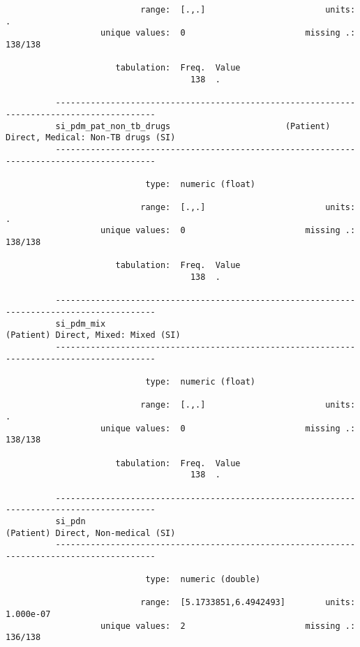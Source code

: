 \documentclass{article}
\begin{document}
\begin{verbatim}
                           range:  [.,.]                        units:  .
                   unique values:  0                        missing .:  138/138
          
                      tabulation:  Freq.  Value
                                     138  .
          
          ------------------------------------------------------------------------------------------
          si_pdm_pat_non_tb_drugs                       (Patient) Direct, Medical: Non-TB drugs (SI)
          ------------------------------------------------------------------------------------------
          
                            type:  numeric (float)
          
                           range:  [.,.]                        units:  .
                   unique values:  0                        missing .:  138/138
          
                      tabulation:  Freq.  Value
                                     138  .
          
          ------------------------------------------------------------------------------------------
          si_pdm_mix                                             (Patient) Direct, Mixed: Mixed (SI)
          ------------------------------------------------------------------------------------------
          
                            type:  numeric (float)
          
                           range:  [.,.]                        units:  .
                   unique values:  0                        missing .:  138/138
          
                      tabulation:  Freq.  Value
                                     138  .
          
          ------------------------------------------------------------------------------------------
          si_pdn                                                  (Patient) Direct, Non-medical (SI)
          ------------------------------------------------------------------------------------------
          
                            type:  numeric (double)
          
                           range:  [5.1733851,6.4942493]        units:  1.000e-07
                   unique values:  2                        missing .:  136/138
          

\end{verbatim}
\end{document}
